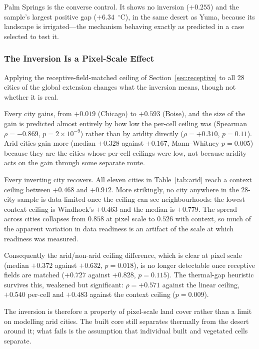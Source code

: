 \documentclass[remotesensing,article,submit,oneauthor]{Definitions/mdpi}
\begin{document}
Palm Springs is the converse control. It shows no inversion ($+0.255$)
and the sample's largest positive gap ($+6.34$~$^{\circ}$C), in the same
desert as Yuma, because its landscape is irrigated---the mechanism
behaving exactly as predicted in a case selected to test it.

\subsubsection{The Inversion Is a Pixel-Scale Effect}
\label{sec:pixelscale}

Applying the receptive-field-matched ceiling of
Section~\ref{sec:receptive} to all 28 cities of the global extension
changes what the inversion means, though not whether it is real.

Every city gains, from $+0.019$ (Chicago) to $+0.593$ (Boise), and the
size of the gain is predicted almost entirely by how low the per-cell
ceiling was (Spearman $\rho = -0.869$, $p = 2 \times 10^{-9}$) rather
than by aridity directly ($\rho = +0.310$, $p = 0.11$). Arid cities gain
more (median $+0.328$ against $+0.167$, Mann--Whitney $p = 0.005$)
because they are the cities whose per-cell ceilings were low, not because
aridity acts on the gain through some separate route.

Every inverting city recovers. All eleven cities in
Table~\ref{tab:arid} reach a context ceiling between $+0.468$ and
$+0.912$. More strikingly, no city anywhere in the 28-city sample is
data-limited once the ceiling can see neighbourhoods: the lowest context
ceiling is Windhoek's $+0.463$ and the median is $+0.779$. The spread
across cities collapses from $0.858$ at pixel scale to $0.526$ with
context, so much of the apparent variation in data readiness is an
artifact of the scale at which readiness was measured.

Consequently the arid/non-arid ceiling difference, which is clear at
pixel scale (median $+0.372$ against $+0.632$, $p = 0.018$), is no longer
detectable once receptive fields are matched ($+0.727$ against $+0.828$,
$p = 0.115$). The thermal-gap heuristic survives this, weakened but
significant: $\rho = +0.571$ against the linear ceiling, $+0.540$
per-cell and $+0.483$ against the context ceiling ($p = 0.009$).

The inversion is therefore a property of pixel-scale land cover rather
than a limit on modelling arid cities. The built core still separates
thermally from the desert around it; what fails is the assumption that
individual built and vegetated cells separate.
\end{document}
